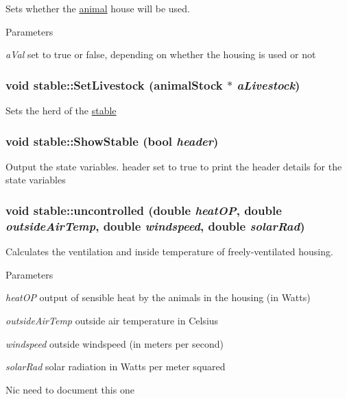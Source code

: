 Sets whether the \hyperlink{classanimal}{animal} house will be used. 
\begin{DoxyParams}{Parameters}
\item[{\em aVal}]set to true or false, depending on whether the housing is used or not \end{DoxyParams}
\hypertarget{classstable_a8d74bb1d63bc771084f2b94f1c1eed96}{
\subsubsection[{SetLivestock}]{\setlength{\rightskip}{0pt plus 5cm}void stable::SetLivestock ({\bf animalStock} $\ast$ {\em aLivestock})}}
\label{classstable_a8d74bb1d63bc771084f2b94f1c1eed96}
Sets the herd of the \hyperlink{classstable}{stable} \hypertarget{classstable_a1d024423d843bb60ff772cfebc61b1ef}{
\subsubsection[{ShowStable}]{\setlength{\rightskip}{0pt plus 5cm}void stable::ShowStable (bool {\em header})}}
\label{classstable_a1d024423d843bb60ff772cfebc61b1ef}


Output the state variables. header set to true to print the header details for the state variables \hypertarget{classstable_a28efbc6e9afeb220d069ac7ccba7343a}{
\subsubsection[{uncontrolled}]{\setlength{\rightskip}{0pt plus 5cm}void stable::uncontrolled (double {\em heatOP}, \/  double {\em outsideAirTemp}, \/  double {\em windspeed}, \/  double {\em solarRad})}}
\label{classstable_a28efbc6e9afeb220d069ac7ccba7343a}


Calculates the ventilation and inside temperature of freely-\/ventilated housing. 
\begin{DoxyParams}{Parameters}
\item[{\em heatOP}]output of sensible heat by the animals in the housing (in Watts) \item[{\em outsideAirTemp}]outside air temperature in Celsius \item[{\em windspeed}]outside windspeed (in meters per second) \item[{\em solarRad}]solar radiation in Watts per meter squared\end{DoxyParams}
Nic need to document this one 

